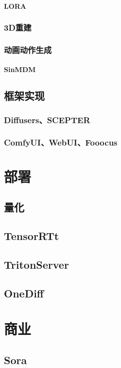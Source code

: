 \documentclass[lang=cn,newtx,10pt,scheme=chinese]{elegantbook}
\begin{document}
\subsubsection{LORA}
\subsection{3D重建}
\subsection{动画动作生成}
\subsubsection{SinMDM}

\section{框架实现}
\subsection{Diffusers、SCEPTER}
\subsection{ComfyUI、WebUI、Fooocus}


\chapter{部署}
\section{量化}
\section{TensorRTt}
\section{TritonServer}
\section{OneDiff}

\chapter{商业}
\section{Sora}
\end{document}
